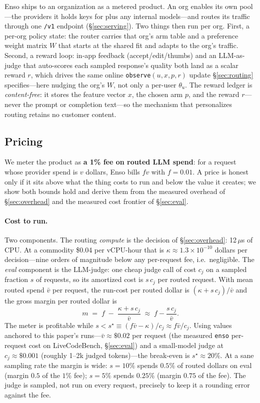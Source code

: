 \documentclass[11pt]{article}
\begin{document}
Enso ships to an organization as a metered product. An org enables its own
pool---the providers it holds keys for plus any internal models---and routes its
traffic through one \texttt{/v1} endpoint (\S\ref{sec:serving}). Two things then run
per org. First, a per-org policy state: the router carries that org's arm table and
a preference weight matrix $W$ that starts at the shared fit and adapts to the org's
traffic. Second, a reward loop: in-app feedback (accept/edit/thumbs) and an
LLM-as-judge that auto-scores each sampled response's quality both land as a scalar
reward $r$, which drives the same online \texttt{observe}$(u,x,p,r)$ update
\S\ref{sec:routing} specifies---here nudging the org's $W$, not only a per-user
$\theta_u$. The reward ledger is \emph{content-free}: it stores the feature vector
$x$, the chosen arm $p$, and the reward $r$---never the prompt or completion
text---so the mechanism that personalizes routing retains no customer content.

\subsection{Pricing}
\label{sec:pricing}

We meter the product as \textbf{a 1\% fee on routed LLM spend}: for a request whose
provider spend is $v$ dollars, Enso bills $f v$ with $f = 0.01$. A price is honest
only if it sits above what the thing costs to run and below the value it creates; we
show both bounds hold and derive them from the measured overhead of
\S\ref{sec:overhead} and the measured cost frontier of \S\ref{sec:eval}.

\paragraph{Cost to run.} Two components. The routing \emph{compute} is the decision
of \S\ref{sec:overhead}: 12\,$\mu$s of CPU. At a commodity \$0.04 per vCPU-hour that
is $\kappa \approx 1.3\times10^{-10}$ dollars per decision---nine orders of magnitude
below any per-request fee, i.e.\ negligible. The \emph{eval} component is the
LLM-judge: one cheap judge call of cost $c_j$ on a sampled fraction $s$ of requests,
so its amortized cost is $s\,c_j$ per routed request. With mean routed spend $\bar v$
per request, the run-cost per routed dollar is $(\kappa + s\,c_j)/\bar v$ and the
gross margin per routed dollar is
\begin{equation}
m \;=\; f \;-\; \frac{\kappa + s\,c_j}{\bar v}\;\approx\; f - \frac{s\,c_j}{\bar v}.
\end{equation}
The meter is profitable while $s < s^\star \equiv (f\bar v - \kappa)/c_j \approx
f\bar v / c_j$. Using values anchored to this paper's runs---$\bar v \approx \$0.02$
per request (the measured \texttt{enso} per-request cost on LiveCodeBench,
\S\ref{sec:eval}) and a small-model judge at $c_j \approx \$0.001$ (roughly 1--2k
judged tokens)---the break-even is $s^\star \approx 20\%$. At a sane sampling rate the
margin is wide: $s=10\%$ spends $0.5\%$ of routed dollars on eval (margin $0.5$ of
the $1\%$ fee); $s=5\%$ spends $0.25\%$ (margin $0.75$ of the fee). The judge is
sampled, not run on every request, precisely to keep it a rounding error against the
fee.
\end{document}
